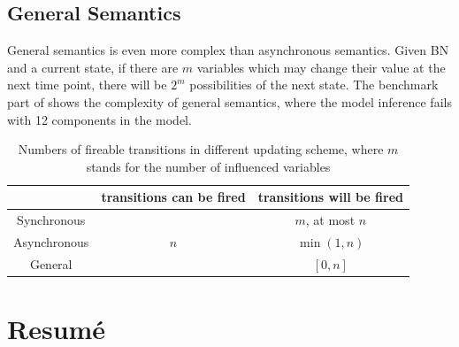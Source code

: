\subsection{General Semantics}
General semantics is even more complex than asynchronous semantics.
Given BN and a current state, if there are $m$ variables which may change their value at the next time point, there will be $2^m$ possibilities of the next state.
The benchmark part of \cite{ribeiro2018learning} shows the complexity of general semantics, where the model inference fails with 12 components in the model. 
\begin{table}[ht]
    \centering
    \begin{tabular}{c|c|c}
            &transitions can be fired&transitions will be fired\\
            \hline
         Synchronous & \multirow{3}{*}{$n$} & $m$, at most $n$\\\cline{1-1} \cline{3-3}
            
         Asynchronous & & $\min(1,n)$\\ \cline{1-1} \cline{3-3}
            
         General &  & $[0,n]$
    \end{tabular}
    \caption[Update schemes]{Numbers of fireable transitions in different updating scheme, where $m$ stands for the number of influenced variables}
    \label{tab:semantics}
\end{table}

\section{Resum\'e}